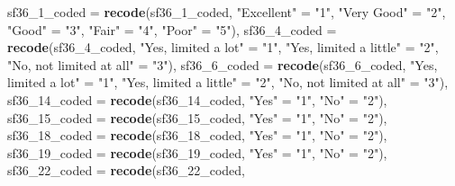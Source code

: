 \documentclass[]{article}
\newenvironment{Shaded}{\begin{snugshade}}{\end{snugshade}}
\newcommand{\DataTypeTok}[1]{\textcolor[rgb]{0.13,0.29,0.53}{#1}}
\newcommand{\DecValTok}[1]{\textcolor[rgb]{0.00,0.00,0.81}{#1}}
\newcommand{\KeywordTok}[1]{\textcolor[rgb]{0.13,0.29,0.53}{\textbf{#1}}}
\newcommand{\NormalTok}[1]{#1}
\newcommand{\StringTok}[1]{\textcolor[rgb]{0.31,0.60,0.02}{#1}}
\begin{document}
\begin{Shaded}
\begin{Highlighting}[]
{{         \DataTypeTok{sf36_1_coded =} \KeywordTok{recode}\NormalTok{(sf36_}\DecValTok{1}\NormalTok{_coded,}
                         \StringTok{"Excellent"}\NormalTok{ =}\StringTok{ "1"}\NormalTok{,}
                         \StringTok{"Very Good"}\NormalTok{ =}\StringTok{ "2"}\NormalTok{,}
                         \StringTok{"Good"}\NormalTok{ =}\StringTok{ "3"}\NormalTok{,}
                         \StringTok{"Fair"}\NormalTok{ =}\StringTok{ "4"}\NormalTok{,}
                         \StringTok{"Poor"}\NormalTok{ =}\StringTok{ "5"}\NormalTok{),}
         \DataTypeTok{sf36_4_coded =} \KeywordTok{recode}\NormalTok{(sf36_}\DecValTok{4}\NormalTok{_coded, }
                         \StringTok{"Yes, limited a lot"}\NormalTok{ =}\StringTok{ "1"}\NormalTok{,}
                         \StringTok{"Yes, limited a little"}\NormalTok{ =}\StringTok{ "2"}\NormalTok{,}
                         \StringTok{"No, not limited at all"}\NormalTok{ =}\StringTok{ "3"}\NormalTok{),}
         \DataTypeTok{sf36_6_coded =} \KeywordTok{recode}\NormalTok{(sf36_}\DecValTok{6}\NormalTok{_coded, }
                         \StringTok{"Yes, limited a lot"}\NormalTok{ =}\StringTok{ "1"}\NormalTok{,}
                         \StringTok{"Yes, limited a little"}\NormalTok{ =}\StringTok{ "2"}\NormalTok{,}
                         \StringTok{"No, not limited at all"}\NormalTok{ =}\StringTok{ "3"}\NormalTok{),}
         \DataTypeTok{sf36_14_coded =} \KeywordTok{recode}\NormalTok{(sf36_}\DecValTok{14}\NormalTok{_coded, }
                         \StringTok{"Yes"}\NormalTok{ =}\StringTok{ "1"}\NormalTok{,}
                         \StringTok{"No"}\NormalTok{ =}\StringTok{ "2"}\NormalTok{),}
         \DataTypeTok{sf36_15_coded =} \KeywordTok{recode}\NormalTok{(sf36_}\DecValTok{15}\NormalTok{_coded, }
                         \StringTok{"Yes"}\NormalTok{ =}\StringTok{ "1"}\NormalTok{,}
                         \StringTok{"No"}\NormalTok{ =}\StringTok{ "2"}\NormalTok{), }
         \DataTypeTok{sf36_18_coded =} \KeywordTok{recode}\NormalTok{(sf36_}\DecValTok{18}\NormalTok{_coded, }
                         \StringTok{"Yes"}\NormalTok{ =}\StringTok{ "1"}\NormalTok{,}
                         \StringTok{"No"}\NormalTok{ =}\StringTok{ "2"}\NormalTok{), }
         \DataTypeTok{sf36_19_coded =} \KeywordTok{recode}\NormalTok{(sf36_}\DecValTok{19}\NormalTok{_coded, }
                         \StringTok{"Yes"}\NormalTok{ =}\StringTok{ "1"}\NormalTok{,}
                         \StringTok{"No"}\NormalTok{ =}\StringTok{ "2"}\NormalTok{),}
         \DataTypeTok{sf36_22_coded =} \KeywordTok{recode}\NormalTok{(sf36_}\DecValTok{22}\NormalTok{_coded,}
}}
\end{Highlighting}
\end{Shaded}
\end{document}
